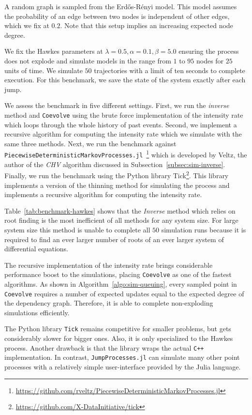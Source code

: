 \documentclass{juliacon}
\numberwithin{equation}{section}
\begin{document}
A random graph is sampled from the Erd\H{o}s-Rényi model. This model assumes the probability of an edge between two nodes is independent of other edges, which we fix at \( 0.2 \). Note that this setup implies an increasing expected node degree.

We fix the Hawkes parameters at \( \lambda = 0.5 , \alpha = 0.1 , \beta = 5.0 \) ensuring the process does not explode and simulate models in the range from \( 1 \) to \( 95 \) nodes for \( 25 \) units of time. We simulate \( 50 \) trajectories with a limit of ten seconds to complete execution. For this benchmark, we save the state of the system exactly after each jump.

We assess the benchmark in five different settings. First, we run the \textit{inverse} method and \texttt{Coevolve} using the brute force implementation of the intensity rate which loops through the whole history of past events. Second, we implement a recursive algorithm for computing the intensity rate which we simulate with the same three methods. Next, we run the benchmark against \texttt{PiecewiseDeterministicMarkovProcesses.jl}~\footnote{\url{https://github.com/rveltz/PiecewiseDeterministicMarkovProcesses.jl}} which is developed by Veltz, the author of the \textit{CHV} algorithm discussed in Subsection~\ref{subsec:sim-inverse}. Finally, we run the benchmark using the Python library Tick\footnote{\url{https://github.com/X-DataInitiative/tick}}. This library implements a version of the thinning method for simulating the process and implements a recursive algorithm for computing the intensity rate.

Table~\ref{tab:benchmark-hawkes} shows that the \textit{Inverse} method which relies on root finding is the most inefficient of all methods for any system size. For large system size this method is unable to complete all \( 50 \) simulation runs because it is required to find an ever larger number of roots of an ever larger system of differential equations.

The recursive implementation of the intensity rate brings considerable performance boost to the simulations, placing \texttt{Coevolve} as one of the fastest algorithms. As shown in Algorithm~\ref{algo:sim-queuing}, every sampled point in \texttt{Coevolve} requires a number of expected updates equal to the expected degree of the dependency graph. Therefore, it is able to complete non-exploding simulations efficiently.

The Python library \texttt{Tick} remains competitive for smaller problems, but gets considerably slower for bigger ones. Also, it is only specialized to the Hawkes process. Another drawback is that the library wraps the actual \texttt{C++} implementation. In contrast, \texttt{JumpProcesses.jl} can simulate many other point processes with a relatively simple user-interface provided by the Julia language.
\end{document}
